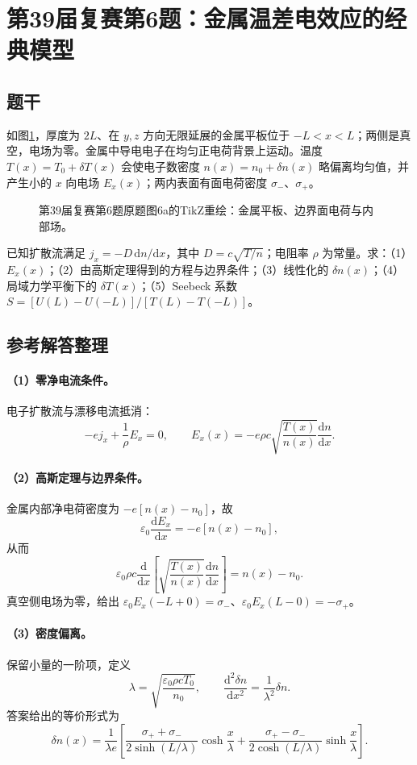 \section{第39届复赛第6题：金属温差电效应的经典模型}

\subsection{题干}
如图\ref{fig:cpho39q06structure}，厚度为 $2L$、在 $y,z$ 方向无限延展的金属平板位于 $-L<x<L$；两侧是真空，电场为零。金属中导电电子在均匀正电荷背景上运动。温度 $T(x)=T_0+\delta T(x)$ 会使电子数密度 $n(x)=n_0+\delta n(x)$ 略偏离均匀值，并产生小的 $x$ 向电场 $E_x(x)$；两内表面有面电荷密度 $\sigma_-$、$\sigma_+$。

\begin{figure}[htbp]\centering
  
  \caption{第39届复赛第6题原题图6a的TikZ重绘：金属平板、边界面电荷与内部场。}\label{fig:cpho39q06structure}
\end{figure}

已知扩散流满足 $j_x=-D\,\mathrm dn/\mathrm dx$，其中 $D=c\sqrt{T/n}$；电阻率 $\rho$ 为常量。求：（1）$E_x(x)$；（2）由高斯定理得到的方程与边界条件；（3）线性化的 $\delta n(x)$；（4）局域力学平衡下的 $\delta T(x)$；（5）Seebeck 系数 $S=[U(L)-U(-L)]/[T(L)-T(-L)]$。

\subsection{参考解答整理}
\paragraph{（1）零净电流条件。}
电子扩散流与漂移电流抵消：
\[
-e j_x+\frac1\rho E_x=0,
\qquad
\boxed{E_x(x)=-e\rho c\sqrt{\frac{T(x)}{n(x)}}\frac{\mathrm dn}{\mathrm dx}.}
\]

\paragraph{（2）高斯定理与边界条件。}
金属内部净电荷密度为 $-e[n(x)-n_0]$，故
\[
\varepsilon_0\frac{\mathrm dE_x}{\mathrm dx}=-e[n(x)-n_0],
\]
从而
\[
\varepsilon_0\rho c\frac{\mathrm d}{\mathrm dx}
\left[\sqrt{\frac{T(x)}{n(x)}}\frac{\mathrm dn}{\mathrm dx}\right]=n(x)-n_0.
\]
真空侧电场为零，给出 $\varepsilon_0E_x(-L+0)=\sigma_-$、$\varepsilon_0E_x(L-0)=-\sigma_+$。

\paragraph{（3）密度偏离。}
保留小量的一阶项，定义
\[
\lambda=\sqrt{\frac{\varepsilon_0\rho cT_0}{n_0}},
\qquad
\frac{\mathrm d^2\delta n}{\mathrm dx^2}=\frac{1}{\lambda^2}\delta n.
\]
答案给出的等价形式为
\[
\boxed{\delta n(x)=\frac{1}{\lambda e}\left[
\frac{\sigma_++\sigma_-}{2\sinh(L/\lambda)}\cosh\frac{x}{\lambda}
+\frac{\sigma_+-\sigma_-}{2\cosh(L/\lambda)}\sinh\frac{x}{\lambda}\right].}
\]

